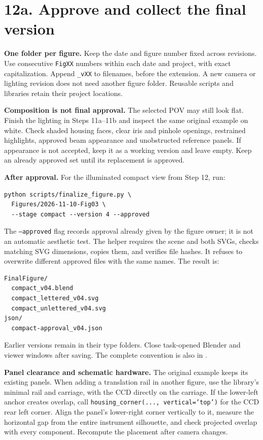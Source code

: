 \documentclass[11pt,a4paper]{article}
\begin{document}
\clearpage
\section*{12a. Approve and collect the final version}
\textbf{One folder per figure.} Keep the date and figure number fixed across revisions. Use consecutive \texttt{FigXX} numbers within each date and project, with exact capitalization. Append \texttt{\_vXX} to filenames, before the extension. A new camera or lighting revision does not need another figure folder. Reusable scripts and libraries retain their project locations.

\textbf{Composition is not final approval.} The selected POV may still look flat. Finish the lighting in Steps 11a--11b and inspect the same original example on white. Check shaded housing faces, clear iris and pinhole openings, restrained highlights, approved beam appearance and unobstructed reference panels. If appearance is not accepted, keep it as a working version and leave  empty. Keep an already approved set until its replacement is approved.

\textbf{After approval.} For the illuminated compact view from Step 12, run:
\begin{Verbatim}[fontsize=\small]
python scripts/finalize_figure.py \
  Figures/2026-11-10-Fig03 \
  --stage compact --version 4 --approved
\end{Verbatim}
The \texttt{--approved} flag records approval already given by the figure owner; it is not an automatic aesthetic test. The helper requires the scene and both SVGs, checks matching SVG dimensions, copies them, and verifies file hashes. It refuses to overwrite different approved files with the same names. The result is:
\begin{Verbatim}[fontsize=\small]
FinalFigure/
  compact_v04.blend
  compact_lettered_v04.svg
  compact_unlettered_v04.svg
json/
  compact-approval_v04.json
\end{Verbatim}
Earlier versions remain in their type folders. Close task-opened Blender and viewer windows after saving. The complete convention is also in .

\textbf{Panel clearance and schematic hardware.} The original example keeps its existing panels. When adding a translation rail in another figure, use the library's minimal rail and carriage, with the CCD directly on the carriage. If the lower-left anchor creates overlap, call \texttt{housing\_corner(..., vertical='top')} for the CCD rear left corner. Align the panel's lower-right corner vertically to it, measure the horizontal gap from the entire instrument silhouette, and check projected overlap with every component. Recompute the placement after camera changes.
\end{document}

